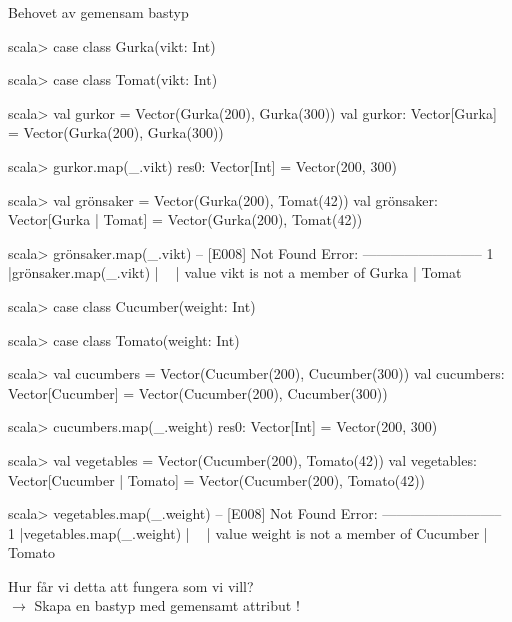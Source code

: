 \begin{Slide}{Behovet av gemensam bastyp}
  \SlideFontTiny 
\ifswedish
\begin{REPLsmall}
scala> case class Gurka(vikt: Int)

scala> case class Tomat(vikt: Int)

scala> val gurkor = Vector(Gurka(200), Gurka(300))
val gurkor: Vector[Gurka] = Vector(Gurka(200), Gurka(300))

scala> gurkor.map(_.vikt)
res0: Vector[Int] = Vector(200, 300)

scala> val grönsaker = Vector(Gurka(200), Tomat(42))
val grönsaker: Vector[Gurka | Tomat] = Vector(Gurka(200), Tomat(42))

scala> grönsaker.map(_.vikt)
-- [E008] Not Found Error: --------------------------
1 |grönsaker.map(_.vikt)
  |              ^^^^^^
  |              value vikt is not a member of Gurka | Tomat
\end{REPLsmall}
\else
\begin{REPLsmall}
scala> case class Cucumber(weight: Int)

scala> case class Tomato(weight: Int)

scala> val cucumbers = Vector(Cucumber(200), Cucumber(300))
val cucumbers: Vector[Cucumber] = Vector(Cucumber(200), Cucumber(300))

scala> cucumbers.map(_.weight)
res0: Vector[Int] = Vector(200, 300)

scala> val vegetables = Vector(Cucumber(200), Tomato(42))
val vegetables: Vector[Cucumber | Tomato] = Vector(Cucumber(200), Tomato(42))

scala> vegetables.map(_.weight)
-- [E008] Not Found Error: --------------------------
1 |vegetables.map(_.weight)
  |              ^^^^^^
  |              value weight is not a member of Cucumber | Tomato
\end{REPLsmall}
\fi{}
Hur får vi detta att fungera som vi vill? \pause\\$\rightarrow$ Skapa en bastyp  med gemensamt attribut \ifswedish{}\else{}\fi{}!
\end{Slide}

